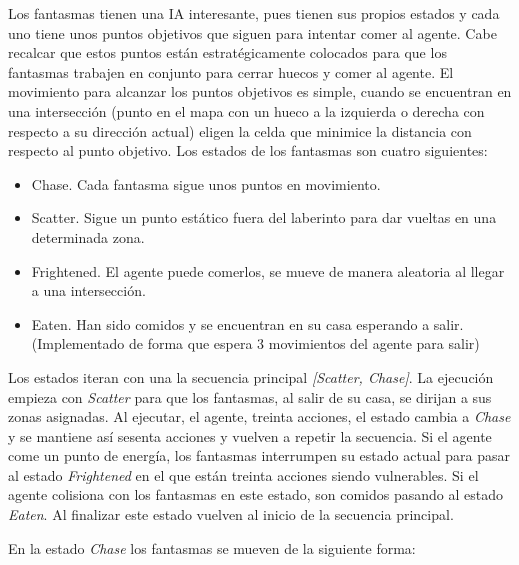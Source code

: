 		
		Los fantasmas tienen una IA interesante, pues tienen sus propios estados y cada uno tiene unos puntos objetivos que siguen para intentar comer al agente. Cabe recalcar que estos puntos están estratégicamente colocados para que los fantasmas trabajen en conjunto para cerrar huecos y comer al agente. El movimiento para alcanzar los puntos objetivos es simple, cuando se encuentran en una intersección (punto en el mapa con un hueco a la izquierda o derecha con respecto a su dirección actual) eligen la celda que minimice la distancia con respecto al punto objetivo. Los estados de los fantasmas son cuatro siguientes:
		
		\begin{itemize}
			\item Chase. Cada fantasma sigue unos puntos en movimiento.
			\vspace*{-0.3cm}
			\item Scatter. Sigue un punto estático fuera del laberinto para dar vueltas en una determinada zona.
			\vspace*{-0.3cm}
			\item Frightened. El agente puede comerlos, se mueve de manera aleatoria al llegar a una intersección.
			\vspace*{-0.3cm}
			\item Eaten. Han sido comidos y se encuentran en su casa esperando a salir. (Implementado de forma que espera 3 movimientos del agente para salir)
		\end{itemize} 
		
		Los estados iteran con una la secuencia principal \textit{[Scatter, Chase]}. La ejecución empieza con \textit{Scatter} para que los fantasmas, al salir de su casa, se dirijan a sus zonas asignadas. Al ejecutar, el agente, treinta acciones, el estado cambia a \textit{Chase} y se mantiene así sesenta acciones y vuelven a repetir la secuencia. Si el agente come un punto de energía, los fantasmas interrumpen su estado actual para pasar al estado \textit{Frightened} en el que están treinta acciones siendo vulnerables. Si el agente colisiona con los fantasmas en este estado, son comidos pasando al estado \textit{Eaten}. Al finalizar este estado vuelven al inicio de la secuencia principal.
		
		
		
		\begin{flushleft}
			En la estado \textit{Chase} los fantasmas se mueven de la siguiente forma:
		\end{flushleft}
		
